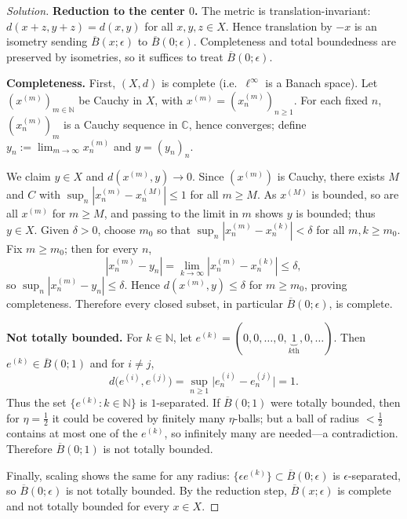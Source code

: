 \documentclass[12pt, a4paper]{report}
\theoremstyle{spaced}
\begin{document}
\begin{proof}[Solution]
	\textbf{Reduction to the center $0$.}
	The metric is translation-invariant: $d(x+z,y+z)=d(x,y)$ for all $x,y,z\in X$.
	Hence translation by $-x$ is an isometry sending $\overline{B}(x;\epsilon)$ to
	$\overline{B}(0;\epsilon)$. Completeness and total boundedness are preserved by
	isometries, so it suffices to treat $\overline{B}(0;\epsilon)$.

	\medskip
	\textbf{Completeness.}
	First, $(X,d)$ is complete (i.e.\ $\ell^\infty$ is a Banach space). Let $(x^{(m)})_{m\in\mathbb{N}}$
	be Cauchy in $X$, with $x^{(m)}=(x^{(m)}_n)_{n\ge1}$. For each fixed $n$, $(x^{(m)}_n)_m$ is a Cauchy
	sequence in $\mathbb{C}$, hence converges; define $y_n:=\lim_{m\to\infty}x^{(m)}_n$ and $y=(y_n)_n$.

	We claim $y\in X$ and $d(x^{(m)},y)\to0$. Since $(x^{(m)})$ is Cauchy, there exists $M$ and $C$ with
	$\sup_n|x^{(m)}_n-x^{(M)}_n|\le 1$ for all $m\ge M$. As $x^{(M)}$ is bounded, so are all $x^{(m)}$ for $m\ge M$,
	and passing to the limit in $m$ shows $y$ is bounded; thus $y\in X$.
	Given $\delta>0$, choose $m_0$ so that $\sup_n|x^{(m)}_n-x^{(k)}_n|<\delta$ for all $m,k\ge m_0$.
	Fix $m\ge m_0$; then for every $n$,
	\[
		|x^{(m)}_n-y_n|=\lim_{k\to\infty}|x^{(m)}_n-x^{(k)}_n|\le \delta,
	\]
	so $\sup_n|x^{(m)}_n-y_n|\le\delta$. Hence $d(x^{(m)},y)\le\delta$ for $m\ge m_0$, proving completeness.
	Therefore every closed subset, in particular $\overline{B}(0;\epsilon)$, is complete.

	\medskip
	\textbf{Not totally bounded.}
	For $k\in\mathbb{N}$, let $e^{(k)}=(0,0,\dots,0,\underbrace{1}_{k\text{th}},0,\dots)$.
	Then $e^{(k)}\in \overline{B}(0;1)$ and for $i\ne j$,
	\[
		d\bigl(e^{(i)},e^{(j)}\bigr)=\sup_{n\ge1}\bigl|e^{(i)}_n-e^{(j)}_n\bigr|=1.
	\]
	Thus the set $\{e^{(k)}:k\in\mathbb{N}\}$ is $1$-separated. If $\overline{B}(0;1)$ were totally bounded,
	then for $\eta=\tfrac12$ it could be covered by finitely many $\eta$-balls; but a ball of radius $<\tfrac12$
	contains at most one of the $e^{(k)}$, so infinitely many are needed—a contradiction. Therefore
	$\overline{B}(0;1)$ is not totally bounded.

	Finally, scaling shows the same for any radius: $\{\epsilon e^{(k)}\}\subset \overline{B}(0;\epsilon)$ is
	$\epsilon$-separated, so $\overline{B}(0;\epsilon)$ is not totally bounded. By the reduction step,
	$\overline{B}(x;\epsilon)$ is complete and not totally bounded for every $x\in X$.
\end{proof}
\end{document}
